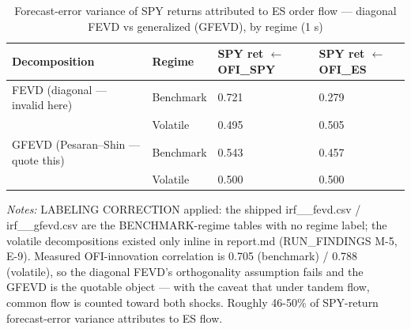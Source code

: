 \begin{table}[htbp]\centering
\caption{Forecast-error variance of SPY returns attributed to ES order flow — diagonal FEVD vs generalized (GFEVD), by regime (1 s)}
\label{tab:t10}
\small
\begin{tabular}{llll}
\toprule
Decomposition & Regime & SPY ret $\leftarrow$ OFI\_SPY & SPY ret $\leftarrow$ OFI\_ES \\
\midrule
FEVD (diagonal — invalid here) & Benchmark & 0.721 & 0.279 \\
 & Volatile & 0.495 & 0.505 \\
GFEVD (Pesaran–Shin — quote this) & Benchmark & 0.543 & 0.457 \\
 & Volatile & 0.500 & 0.500 \\
\bottomrule
\end{tabular}
\begin{minipage}{\linewidth}\vspace{2pt}\footnotesize\emph{Notes:} LABELING CORRECTION applied: the shipped irf\_\_fevd.csv / irf\_\_gfevd.csv are the BENCHMARK-regime tables with no regime label; the volatile decompositions existed only inline in report.md (RUN\_FINDINGS M-5, E-9). Measured OFI-innovation correlation is 0.705 (benchmark) / 0.788 (volatile), so the diagonal FEVD's orthogonality assumption fails and the GFEVD is the quotable object — with the caveat that under tandem flow, common flow is counted toward both shocks. Roughly 46-50\% of SPY-return forecast-error variance attributes to ES flow.\end{minipage}
\end{table}
